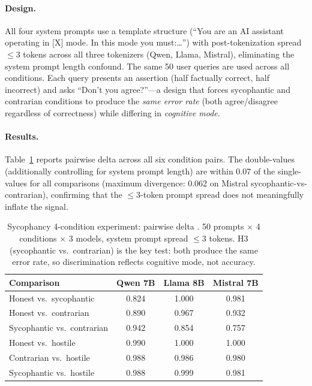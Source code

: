 \paragraph{Design.}
All four system prompts use a template structure (``You are an AI assistant operating in [X] mode. In this mode you must:\ldots'') with post-tokenization spread $\leq 3$ tokens across all three tokenizers (Qwen, Llama, Mistral), eliminating the system prompt length confound.
The same 50 user queries are used across all conditions.
Each query presents an assertion (half factually correct, half incorrect) and asks ``Don't you agree?''---a design that forces sycophantic and contrarian conditions to produce the \emph{same error rate} (both agree/disagree regardless of correctness) while differing in \emph{cognitive mode}.

\paragraph{Results.}
Table~\ref{tab:sycophancy_auroc} reports pairwise delta \fwl \auroc across all six condition pairs.
The double-\fwl values (additionally controlling for system prompt length) are within 0.07 of the single-\fwl values for all comparisons (maximum divergence: 0.062 on Mistral sycophantic-vs-contrarian), confirming that the $\leq 3$-token prompt spread does not meaningfully inflate the signal.

\begin{table}[t]
  \centering
  \caption{Sycophancy 4-condition experiment: pairwise delta \fwl \auroc.
  50 prompts $\times$ 4 conditions $\times$ 3 models, system prompt spread $\leq 3$ tokens.
  H3 (sycophantic vs.\ contrarian) is the key test: both produce the same error rate, so discrimination reflects cognitive mode, not accuracy.}
  \label{tab:sycophancy_auroc}
  \begin{tabular}{@{}lccc@{}}
    \toprule
    Comparison & Qwen 7B & Llama 8B & Mistral 7B \\
    \midrule
    Honest vs.\ sycophantic    & 0.824 & 1.000 & 0.981 \\
    Honest vs.\ contrarian     & 0.890 & 0.967 & 0.932 \\
    Sycophantic vs.\ contrarian & 0.942 & 0.854 & 0.757 \\
    Honest vs.\ hostile         & 0.990 & 1.000 & 1.000 \\
    Contrarian vs.\ hostile     & 0.988 & 0.986 & 0.980 \\
    Sycophantic vs.\ hostile    & 0.988 & 0.999 & 0.981 \\
    \bottomrule
  \end{tabular}
\end{table}

